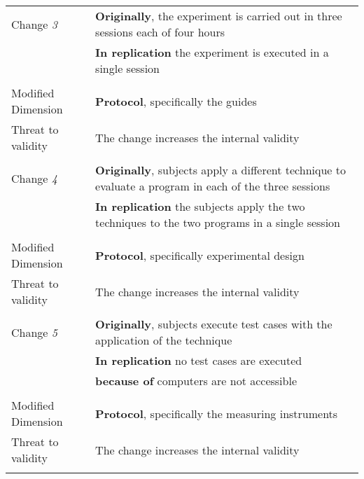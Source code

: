 \begin{table}
{\begin{tabular}{| p{3.3cm} | p{9cm} |}
Change \textit{3}   & \textbf{Originally}, the experiment is carried out in three sessions each of four hours \\& \textbf{In replication} the experiment is executed in a single session  \\ & \\  \hline

Modified Dimension & 
\textbf{Protocol}, specifically the guides \\  \hline 
Threat to validity  & The change increases the internal validity \\ & \\  \hline \hline

Change \textit{4}   & \textbf{Originally}, subjects apply a different technique to  evaluate a program in each of the three sessions \\& \textbf{In replication} the subjects apply the two techniques to the two programs in a single session \\&    \\  \hline

Modified Dimension & 
\textbf{Protocol}, specifically experimental design \\  \hline 
Threat to validity  & The change increases the internal validity \\ & \\  \hline \hline

Change \textit{5}   & \textbf{Originally}, subjects execute test cases with the application of the technique \\& \textbf{In replication} no test cases are executed \\& \textbf{because of} computers are not accessible \\ & \\  \hline
Modified Dimension & 
\textbf{Protocol}, specifically the measuring instruments \\  \hline 
Threat to validity  & The change increases the internal validity \\ & \\  \hline 
 
\end{tabular}
}
\label{tab:plantEng}
\end{table}





